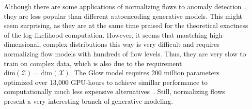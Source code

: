 Although there are some applications of normalizing flows to anomaly detection~\cite{kirichenkoWhyNormalizingFlows2020, dias2020anomaly, rudolph2021same, gudovskiy2022cflow}, they are less popular than different autoencoding generative models. This might seem surprising, as they are at the same time praised for the theoretical exactness of the log-likelihood computation. However, it seems that maatching high-dimensional, complex distributions this way is very difficult and requires normalizing flow models with hundreds of flow levels. Thus, they are very slow to train on complex data, which is also due to the requirement $\text{dim}(\mathcal{Z}) = \text{dim}(\mathcal{X})$. The Glow model requires 200 million parameters optimized over 13,000 GPU-hours to achieve simillar performance to computationally much less expensive alternatives~\cite{kingma2018glow}. Still, normalizing flows present a very interesting branch of generative modeling.



